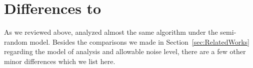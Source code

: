 \documentclass[twoside,11pt]{article}
\numberwithin{equation}{section}
\begin{document}







\appendix
\section{Differences to \citet{soltanolkotabi2013robust}}
As we reviewed above, \citet{soltanolkotabi2013robust} analyzed almost the same algorithm under the semi-random model. Besides the comparisons we made in Section~\ref{sec:RelatedWorks} regarding the model of analysis and allowable noise level, there are a few other minor differences which we list here.
\end{document}
